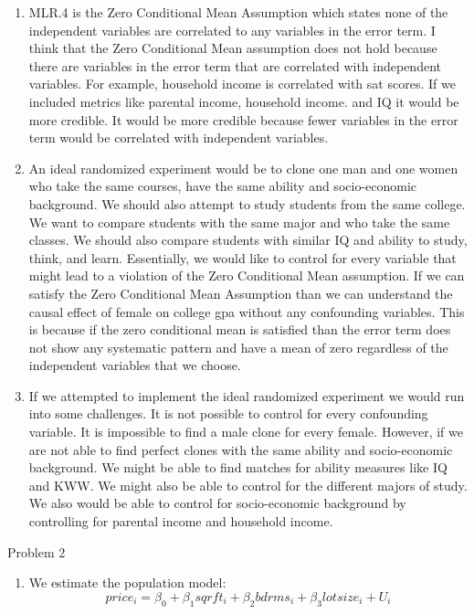 \documentclass[
  12pt,
  landscape]{article}
\providecommand{\tightlist}{%
  \setlength{\itemsep}{0pt}\setlength{\parskip}{0pt}}
\begin{document}
\begin{enumerate}
\def\labelenumi{(\alph{enumi})}
\setcounter{enumi}{6}
\item
  MLR.4 is the Zero Conditional Mean Assumption which states none of the
  independent variables are correlated to any variables in the error
  term. I think that the Zero Conditional Mean assumption does not hold
  because there are variables in the error term that are correlated with
  independent variables. For example, household income is correlated
  with sat scores. If we included metrics like parental income,
  household income. and IQ it would be more credible. It would be more
  credible because fewer variables in the error term would be correlated
  with independent variables.
\item
  An ideal randomized experiment would be to clone one man and one women
  who take the same courses, have the same ability and socio-economic
  background. We should also attempt to study students from the same
  college. We want to compare students with the same major and who take
  the same classes. We should also compare students with similar IQ and
  ability to study, think, and learn. Essentially, we would like to
  control for every variable that might lead to a violation of the Zero
  Conditional Mean assumption. If we can satisfy the Zero Conditional
  Mean Assumption than we can understand the causal effect of female on
  college gpa without any confounding variables. This is because if the
  zero conditional mean is satisfied than the error term does not show
  any systematic pattern and have a mean of zero regardless of the
  independent variables that we choose.
\item
  If we attempted to implement the ideal randomized experiment we would
  run into some challenges. It is not possible to control for every
  confounding variable. It is impossible to find a male clone for every
  female. However, if we are not able to find perfect clones with the
  same ability and socio-economic background. We might be able to find
  matches for ability measures like IQ and KWW. We might also be able to
  control for the different majors of study. We also would be able to
  control for socio-economic background by controlling for parental
  income and household income.
\end{enumerate}

Problem 2

\begin{enumerate}
\def\labelenumi{(\alph{enumi})}
\tightlist
\item
  We estimate the population model: \[
  price_i = \beta_0 + \beta_1sqrft_i + \beta_2bdrms_i + \beta_3lotsize_i + U_i
  \]
\end{enumerate}
\end{document}
